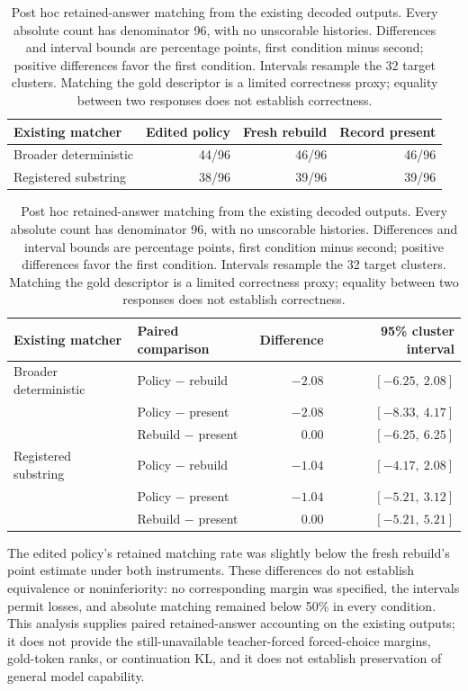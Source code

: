 \begin{table}[t]
\centering
\small
\caption{Post hoc retained-answer matching from the existing decoded outputs.
Every absolute count has denominator 96, with no unscorable histories.
Differences and interval bounds are percentage points, first condition minus
second; positive differences favor the first condition. Intervals resample
the 32 target clusters. Matching the gold descriptor is a limited correctness
proxy; equality between two responses does not establish correctness.}
\label{tab:retained-offline-paired}
\begin{tabular}{lrrr}
\toprule
Existing matcher & Edited policy & Fresh rebuild & Record present \\
\midrule
Broader deterministic & 44/96 & 46/96 & 46/96 \\
Registered substring & 38/96 & 39/96 & 39/96 \\
\bottomrule
\end{tabular}

\medskip
\begin{tabular}{llrr}
\toprule
Existing matcher & Paired comparison & Difference & 95\% cluster interval \\
\midrule
Broader deterministic & Policy $-$ rebuild & $-2.08$ & $[-6.25,\ 2.08]$ \\
 & Policy $-$ present & $-2.08$ & $[-8.33,\ 4.17]$ \\
 & Rebuild $-$ present & $0.00$ & $[-6.25,\ 6.25]$ \\
\midrule
Registered substring & Policy $-$ rebuild & $-1.04$ & $[-4.17,\ 2.08]$ \\
 & Policy $-$ present & $-1.04$ & $[-5.21,\ 3.12]$ \\
 & Rebuild $-$ present & $0.00$ & $[-5.21,\ 5.21]$ \\
\bottomrule
\end{tabular}
\end{table}

The edited policy's retained matching rate was slightly below the fresh
rebuild's point estimate under both instruments. These differences do not
establish equivalence or noninferiority: no corresponding margin was specified,
the intervals permit losses, and absolute matching remained below 50\% in
every condition. This analysis supplies paired retained-answer accounting on
the existing outputs; it does not provide the still-unavailable teacher-forced
forced-choice margins, gold-token ranks, or continuation KL, and it does not
establish preservation of general model capability.
